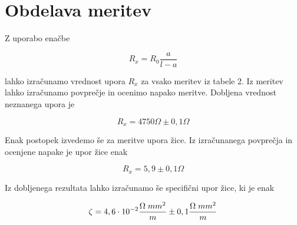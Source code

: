 \documentclass[a4paper]{report}
\begin{document}
\section*{Obdelava meritev}
Z uporabo enačbe 

\[R_x = R_0 \frac{a}{l-a}\]

lahko izračunamo vrednost upora $R_x$ za vsako meritev iz tabele 2. Iz meritev lahko izračunamo povprečje in ocenimo napako meritve. Dobljena
vrednost neznanega upora je 

\[R_x = 4750 \Omega\pm 0,1 \Omega\]

\noindent Enak postopek izvedemo še za meritve upora žice. Iz izračunanega povprečja in ocenjene napake je upor žice enak 

\[R_x = 5,9 \pm 0,1 \Omega \]

 Iz dobljenega rezultata lahko izračunamo še specifični upor žice, ki je enak
 
 \[\zeta = 4,6 \cdot 10^{-2}  \frac{\Omega \hspace{1mm} mm^2}{m} \pm 0,1  \frac{\Omega\hspace{1mm} mm^2}{m} \]
\end{document}
